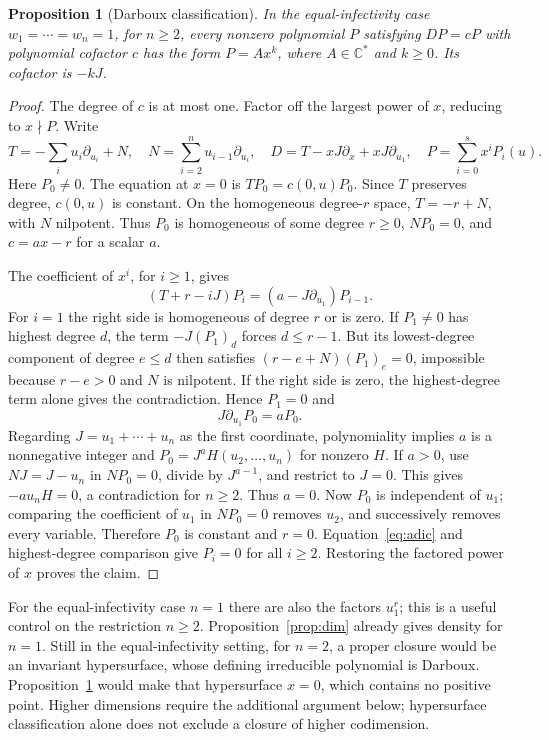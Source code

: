 \documentclass[11pt]{article}
\newtheorem{proposition}[theorem]{Proposition}
\theoremstyle{remark}\newtheorem{remark}[theorem]{Remark}
\newcommand{\C}{\mathbb C}
\begin{document}
\begin{proposition}[Darboux classification]\label{prop:darboux}
In the equal-infectivity case $w_1=\cdots=w_n=1$, for $n\geq2$, every nonzero polynomial $P$ satisfying $DP=cP$ with polynomial cofactor $c$ has the form $P=A x^k$, where $A\in\C^*$ and $k\geq0$. Its cofactor is $-kJ$.
\end{proposition}
\begin{proof}
The degree of $c$ is at most one. Factor off the largest power of $x$, reducing to $x\nmid P$. Write
\[
 T=-\sum_i u_i\partial_{u_i}+N,\quad
 N=\sum_{i=2}^n u_{i-1}\partial_{u_i},\quad
 D=T-xJ\partial_x+xJ\partial_{u_1},\quad
 P=\sum_{i=0}^s x^iP_i(u).
\]
Here $P_0\ne0$. The equation at $x=0$ is $TP_0=c(0,u)P_0$. Since $T$ preserves degree, $c(0,u)$ is constant. On the homogeneous degree-$r$ space, $T=-r+N$, with $N$ nilpotent. Thus $P_0$ is homogeneous of some degree $r\geq0$, $NP_0=0$, and $c=ax-r$ for a scalar $a$.

The coefficient of $x^i$, for $i\geq1$, gives
\begin{equation}\label{eq:adic}
 (T+r-iJ)P_i=(a-J\partial_{u_1})P_{i-1}.
\end{equation}
For $i=1$ the right side is homogeneous of degree $r$ or is zero. If $P_1\ne0$ has highest degree $d$, the term $-J(P_1)_d$ forces $d\leq r-1$. But its lowest-degree component of degree $e\leq d$ then satisfies $(r-e+N)(P_1)_e=0$, impossible because $r-e>0$ and $N$ is nilpotent. If the right side is zero, the highest-degree term alone gives the contradiction. Hence $P_1=0$ and
\[
 J\partial_{u_1}P_0=aP_0.
\]
Regarding $J=u_1+\cdots+u_n$ as the first coordinate, polynomiality implies $a$ is a nonnegative integer and $P_0=J^a H(u_2,\ldots,u_n)$ for nonzero $H$. If $a>0$, use $NJ=J-u_n$ in $NP_0=0$, divide by $J^{a-1}$, and restrict to $J=0$. This gives $-a u_nH=0$, a contradiction for $n\geq2$. Thus $a=0$. Now $P_0$ is independent of $u_1$; comparing the coefficient of $u_1$ in $NP_0=0$ removes $u_2$, and successively removes every variable. Therefore $P_0$ is constant and $r=0$. Equation~\eqref{eq:adic} and highest-degree comparison give $P_i=0$ for all $i\geq2$. Restoring the factored power of $x$ proves the claim.
\end{proof}

For the equal-infectivity case $n=1$ there are also the factors $u_1^r$; this is a useful control on the restriction $n\geq2$. Proposition~\ref{prop:dim} already gives density for $n=1$. Still in the equal-infectivity setting, for $n=2$, a proper closure would be an invariant hypersurface, whose defining irreducible polynomial is Darboux. Proposition~\ref{prop:darboux} would make that hypersurface $x=0$, which contains no positive point. Higher dimensions require the additional argument below; hypersurface classification alone does not exclude a closure of higher codimension.
\end{document}
